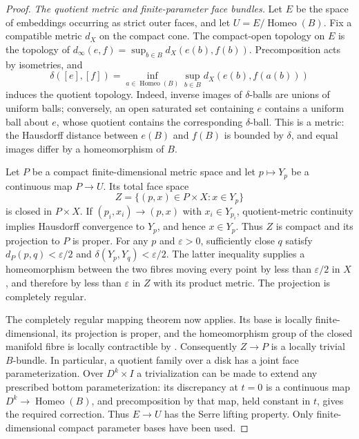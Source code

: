 \begin{proof}
\emph{The quotient metric and finite-parameter face bundles.}
Let $E$ be the space of embeddings occurring as strict outer faces,
and let $U=E/\operatorname{Homeo}(B)$.
Fix a compatible metric $d_X$ on the compact cone.
The compact-open topology on $E$ is the topology of
$d_\infty(e,f)=\sup_{b\in B}d_X(e(b),f(b))$.
Precomposition acts by isometries, and
\[
 \delta([e],[f])=
 \inf_{a\in\operatorname{Homeo}(B)}
       \sup_{b\in B}d_X(e(b),f(a(b)))
\]
induces the quotient topology.
Indeed, inverse images of $\delta$-balls are unions of uniform balls;
conversely, an open saturated set containing $e$ contains a uniform
ball about $e$, whose quotient contains the corresponding
$\delta$-ball.  This is a metric: the Hausdorff distance between
$e(B)$ and $f(B)$ is bounded by $\delta$, and equal images differ by
a homeomorphism of $B$.

Let $P$ be a compact finite-dimensional metric space and let
$p\mapsto Y_p$ be a continuous map $P\to U$.  Its total face space
\[
 Z=\{(p,x)\in P\times X:x\in Y_p\}
\]
is closed in $P\times X$.  If $(p_i,x_i)\to(p,x)$ with
$x_i\in Y_{p_i}$, quotient-metric continuity implies Hausdorff
convergence to $Y_p$, and hence $x\in Y_p$.
Thus $Z$ is compact and its projection to $P$ is proper.
For any $p$ and $\varepsilon>0$, sufficiently close $q$ satisfy
$d_P(p,q)<\varepsilon/2$ and $\delta(Y_p,Y_q)<\varepsilon/2$.
The latter inequality supplies a homeomorphism between the two
fibres moving every point by less than $\varepsilon/2$ in $X$,
and therefore by less than $\varepsilon$ in $Z$ with its product
metric.  The projection is completely regular.

The completely regular mapping theorem
\cite[Proposition~7.1 and preceding definition, p.~605]{ChapmanFerry1979}
now applies.  Its base is locally finite-dimensional, its projection
is proper, and the homeomorphism group of the closed manifold fibre
is locally contractible by
\cite[Corollary~1.1, p.~63]{EdwardsKirby1971}.
Consequently $Z\to P$ is a locally trivial $B$-bundle.
In particular, a quotient family over a disk has a joint face
parameterization.  Over $D^k\times I$ a trivialization can be made
to extend any prescribed bottom parameterization: its discrepancy
at $t=0$ is a continuous map $D^k\to\operatorname{Homeo}(B)$,
and precomposition by that map, held constant in $t$, gives the
required correction.  Thus $E\to U$ has the Serre lifting property.
Only finite-dimensional compact parameter bases have been used.


\end{proof}
